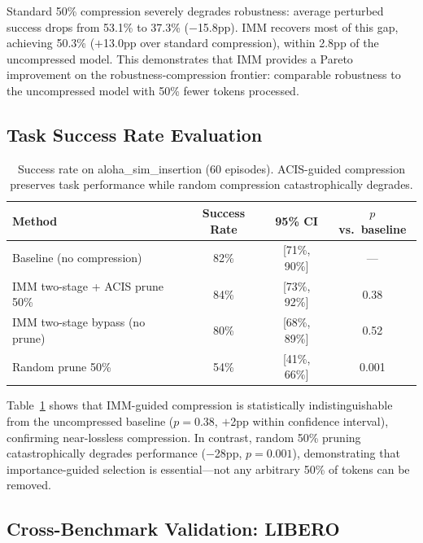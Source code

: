 \documentclass[conference]{corl_2026}
\newcommand{\ours}{IMM}
\begin{document}
Standard 50\% compression severely degrades robustness: average perturbed success drops from 53.1\% to 37.3\% ($-$15.8pp). \ours{} recovers most of this gap, achieving 50.3\% ($+$13.0pp over standard compression), within 2.8pp of the uncompressed model. This demonstrates that \ours{} provides a Pareto improvement on the robustness-compression frontier: comparable robustness to the uncompressed model with 50\% fewer tokens processed.

\subsection{Task Success Rate Evaluation}
\label{sec:success_rate}

\begin{table}[t]
\centering
\caption{Success rate on aloha\_sim\_insertion (60 episodes). ACIS-guided compression preserves task performance while random compression catastrophically degrades.}
\label{tab:aloha_success}
\small
\begin{tabular}{@{}lccc@{}}
\toprule
Method & Success Rate & 95\% CI & $p$ vs.\ baseline \\
\midrule
Baseline (no compression) & 82\% & [71\%, 90\%] & --- \\
IMM two-stage + ACIS prune 50\% & 84\% & [73\%, 92\%] & 0.38 \\
IMM two-stage bypass (no prune) & 80\% & [68\%, 89\%] & 0.52 \\
Random prune 50\% & 54\% & [41\%, 66\%] & 0.001 \\
\bottomrule
\end{tabular}
\end{table}

Table~\ref{tab:aloha_success} shows that \ours{}-guided compression is statistically indistinguishable from the uncompressed baseline ($p=0.38$, $+$2pp within confidence interval), confirming near-lossless compression. In contrast, random 50\% pruning catastrophically degrades performance ($-$28pp, $p=0.001$), demonstrating that importance-guided selection is essential---not any arbitrary 50\% of tokens can be removed.

\subsection{Cross-Benchmark Validation: LIBERO}
\label{sec:libero}
\end{document}
